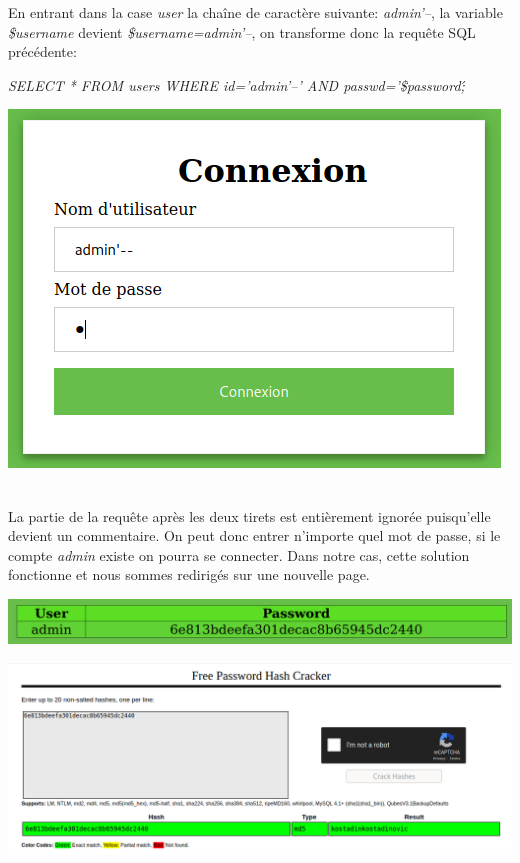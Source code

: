 \documentclass{article}
\begin{document}
En entrant dans la case \textit{user} la chaîne de caractère suivante: \textit{admin'--}, la variable \textit{\$username} devient \textit{\$username=admin'--}, on transforme donc la requête SQL précédente:\\




\begin{minipage}{0.4\linewidth}
    \begin{center}
        \textit{SELECT * FROM users WHERE id='admin'--' AND passwd='\$password\';}\newline
    \end{center}
\end{minipage}\hfill
\begin{minipage}{0.40\linewidth}
\includegraphics[scale=0.30]{img/login_page.png}
\end{minipage}\\

La partie de la requête après les deux tirets est entièrement ignorée puisqu'elle devient un commentaire. On peut donc entrer n'importe quel mot de passe, si le compte \textit{admin} existe on pourra se connecter. Dans notre cas, cette solution fonctionne et nous sommes redirigés sur une nouvelle page.\newline 


   \centerline{\includegraphics[scale=0.25]{img/hash.png}} 
   \centerline{\includegraphics[scale=0.40]{img/password.png}}
\end{document}
